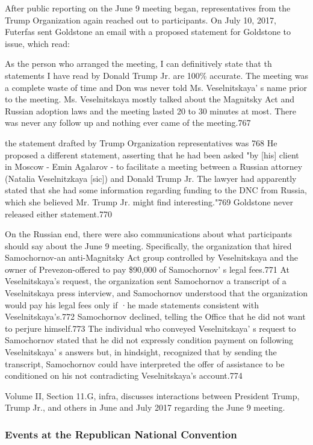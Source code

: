 After public reporting on the June 9 meeting began, representatives from the Trump Organization again reached out to participants. On July 10, 2017, Futerfas sent Goldstone an email with a proposed statement for Goldstone to issue, which read:

As the person who arranged the meeting, I can definitively state that th~ statements I have read by Donald Trump Jr. are 100\% accurate. The meeting was a complete waste of time and Don was never told Ms. Veselnitskaya' s name prior to the meeting. Ms. Veselnitskaya mostly talked about the Magnitsky Act and Russian adoption laws and the meeting lasted 20 to 30 minutes at most. There was never any follow up and nothing ever came of the meeting.767

the statement drafted by Trump Organization representatives was 768 He proposed a different statement, asserting that he had been asked "by [his] client in Moscow -  Emin Agalarov -  to facilitate a  meeting between a  Russian attorney (Natalia Veselnitzkaya [sic]) and Donald Trump Jr. The lawyer had apparently stated that she had some information regarding funding to the DNC from Russia, which she believed Mr. Trump Jr. might find interesting."769 Goldstone never released either statement.770

On the Russian end, there were also communications about what participants should say about the June 9 meeting. Specifically, the organization that hired Samochornov-an anti-Magnitsky Act group controlled by Veselnitskaya and the owner of Prevezon-offered to pay \$90,000 of Samochornov' s  legal fees.771 At Veselnitskaya's request, the organization sent Samochornov a transcript of a Veselnitskaya press interview, and Samochornov understood that the organization would pay his legal fees only if ·he made statements consistent with Veselnitskaya's.772 Samochornov declined,  telling the Office that he did not want to perjure himself.773 The individual who conveyed Veselnitskaya' s request to Samochornov stated that he did not expressly condition payment on following Veselnitskaya' s  answers but, in hindsight, recognized that by sending the transcript, Samochornov could have interpreted the offer of assistance to be conditioned on his not contradicting Veselnitskaya's account.774

Volume II, Section 11.G, infra, discusses interactions between President Trump, Trump Jr., and others in June and July 2017 regarding the June 9 meeting.

\subsubsection{Events at the Republican National Convention}


